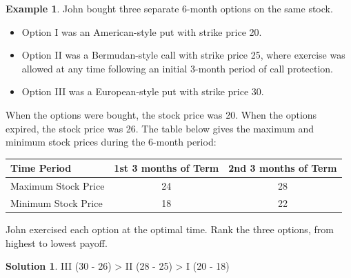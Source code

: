 \documentclass[10pt,handout]{beamer}
\theoremstyle{definition}
\newtheorem*{ex}{Example}
\newtheorem*{sol}{Solution}
\begin{document}
\begin{frame}
  \begin{ex}
    John bought three separate 6-month options on the same stock. %
    \begin{itemize}\setlength\itemsep{0em}
      \item Option I was an American-style put with strike price 20.
      \item Option II was a Bermudan-style call with strike price 25, where exercise was allowed at any time following an initial 3-month period of call protection.
      \item Option III was a European-style put with strike price 30.
    \end{itemize}
    When the options were bought, the stock price was 20. When the options expired, the stock price was 26. The table below gives the maximum and minimum stock prices during the 6-month period: %
    \begin{table}[!htbp]
      \centering
      \begin{tabular}{lcc}
        \toprule
        Time Period & 1st 3 months of Term & 2nd 3 months of Term \\
        \midrule
        Maximum Stock Price & 24 & 28 \\
        Minimum Stock Price & 18 & 22 \\
        \bottomrule
      \end{tabular}
    \end{table}
    John exercised each option at the optimal time. Rank the three options, from highest to lowest payoff.
  \end{ex}
  \begin{sol}
    III (30 - 26) > II (28 - 25) > I (20 - 18) 
  \end{sol}
\end{frame}
\end{document}
